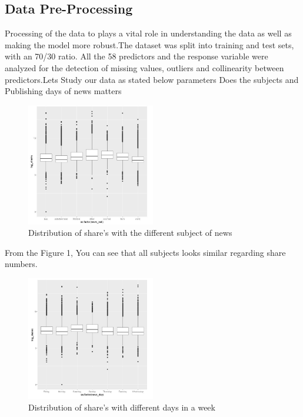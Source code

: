 \documentclass[sigchi]{acmart}
\begin{document}
\subsection{Data Pre-Processing}
Processing of the data to plays a vital role in understanding the data as well as making the model more robust.The dataset was split into training and test sets, with an 70/30 ratio. All the 58 predictors and the response variable were analyzed for the detection of missing values, outliers and collinearity between predictors.Lets Study our data as stated below parameters
Does the subjects and Publishing days of news matters



\begin{figure}[h!]
  \caption{Distribution of share's with the different subject of news}
  \centering
  \includegraphics[width=0.5\textwidth]{SubjectofNews.JPG}
\end{figure}
From the Figure 1, You can see that all subjects looks similar regarding share numbers.


\begin{figure}[h!]
    \caption{Distribution of share's with different days in a week}
    \centering
    \includegraphics[width=0.5\textwidth]{Newsdays.JPG}
\end{figure}
\end{document}
